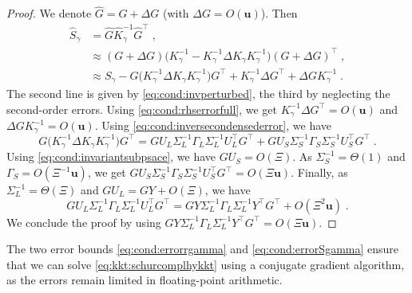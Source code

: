 \documentclass[smallextended]{svjour3}
\newcommand{\epstol}{\mathbf{u}}
\begin{document}
\begin{proof}
  We denote $\widehat{G} = G + \Delta G$ (with $\Delta G = O(\epstol)$). Then
  \begin{equation}
    \begin{aligned}
      \widehat{S}_\gamma &= \widehat{G} \widehat{K}_\gamma^{-1} \widehat{G}^\top \; , \\
                         &\approx (G + \Delta G)\big(K_\gamma^{-1} - K_\gamma^{-1}\Delta K_\gamma K_\gamma^{-1}\big)(G + \Delta G)^\top \;, \\
                    &\approx S_\gamma - G \big(K_\gamma^{-1}\Delta K_\gamma K_\gamma^{-1} \big)G^\top
                    + K_\gamma^{-1} \Delta G^\top + \Delta G K_\gamma^{-1} \; .
    \end{aligned}
  \end{equation}
  The second line is given by \eqref{eq:cond:invperturbed},
  the third by neglecting the second-order errors.
  Using \eqref{eq:cond:rhserrorfull}, we get $K_\gamma^{-1} \Delta G^\top = O(\epstol)$
  and $\Delta G K_\gamma^{-1} = O(\epstol)$.
  Using \eqref{eq:cond:inversecondensederror}, we have
  \begin{equation*}
    G \big(K_\gamma^{-1}\Delta K_\gamma K_\gamma^{-1} \big)G^\top =
G U_L \Sigma_L^{-1} \Gamma_L \Sigma_L^{-1}U_L^\top G^\top  +
G U_S \Sigma_S^{-1} \Gamma_S \Sigma_S^{-1}U_S^\top  G^\top \;.
  \end{equation*}
  Using \eqref{eq:cond:invariantsubpsace}, we have $G U_S = O(\Xi)$.
  As $\Sigma_S^{-1} = \Theta(1)$ and $\Gamma_S = O(\Xi^{-1} \epstol)$, we
  get
  $G U_S \Sigma_S^{-1} \Gamma_S \Sigma_S^{-1}U_S^\top  G^\top = O(\Xi \epstol)$.
  Finally, as $\Sigma_L^{-1} = \Theta(\Xi)$ and $G U_L = GY + O(\Xi)$,
  we have
  \begin{equation}
    G U_L \Sigma_L^{-1} \Gamma_L \Sigma_L^{-1}U_L^\top G^\top =
    G Y \Sigma_L^{-1} \Gamma_L \Sigma_L^{-1}Y^\top G^\top + O(\Xi^2 \epstol) \; .
  \end{equation}
  We conclude the proof by using
  $G Y \Sigma_L^{-1} \Gamma_L \Sigma_L^{-1}Y^\top G^\top = O(\Xi \epstol)$.
\end{proof}
The two error bounds \eqref{eq:cond:errorrgamma} and
\eqref{eq:cond:errorSgamma} ensure that we can solve
\eqref{eq:kkt:schurcomplhykkt} using a conjugate gradient
algorithm, as the errors remain limited in floating-point
arithmetic.
\end{document}
